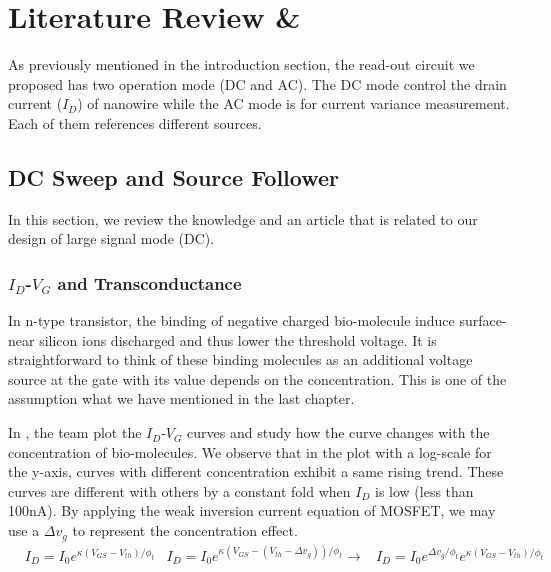 \chapter{Literature Review \&}
As previously mentioned in the introduction section, the read-out circuit we proposed has two operation mode (DC and AC).
The DC mode control the drain current ($I_D$) of nanowire while the AC mode is for current variance measurement.
Each of them references different sources.

\section{DC Sweep and Source Follower}
In this section, we review the knowledge and an article that is related to our design of large signal mode (DC).

\subsection{$I_D$-$V_G$ and Transconductance}
In n-type transistor, the binding of negative charged bio-molecule induce surface-near silicon ions discharged and thus lower the threshold voltage.
It is straightforward to think of these binding molecules as an additional voltage source at the gate with its value depends on the concentration.
This is one of the assumption what we have mentioned in the last chapter.

In \cite{DN17}, the team plot the $I_D$-$V_G$ curves and study how the curve changes with the concentration of bio-molecules.
We observe that in the plot with a log-scale for the y-axis, curves with different concentration exhibit a same rising trend.
These curves are different with others by a constant fold when $I_D$ is low (less than 100nA).
By applying the weak inversion current equation of MOSFET, we may use a $\Delta v_g$ to represent the concentration effect.
\begin{align}
    & I_D = I_{0} e^{\kappa(V_{GS} - V_{th}) / \phi_t}
    & I_D = I_{0} e^{\kappa(V_{GS} - (V_{th} - \Delta v_g)) / \phi_t}
    \rightarrow & I_D = I_0 e^{\Delta v_g / \phi_t} e^{\kappa(V_{GS} - V_{th}) / \phi_t}
\end{align}








